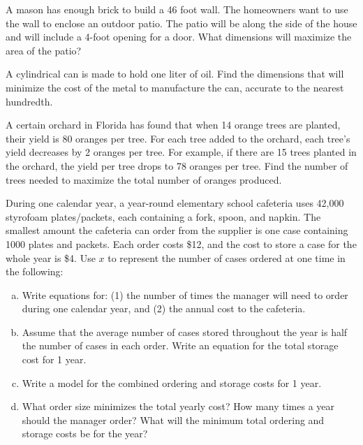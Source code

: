 \documentclass[notes]{subfiles}
\begin{document}
		\begin{ex}
			A mason has enough brick to build a 46 foot wall.  The homeowners want to use the wall to enclose an outdoor patio.  The patio will be along the side of the house and will include a 4-foot opening for a door.  What dimensions will maximize the area of the patio?
		\end{ex}
			
		\begin{ex}
			A cylindrical can is made to hold one liter of oil.  Find the dimensions that will minimize the cost of the metal to manufacture the can, accurate to the nearest hundredth.
		\end{ex}
			\newpage
			
		\begin{ex}
			A certain orchard in Florida has found that when 14 orange trees are planted, their yield is 80 oranges per tree.  For each tree added to the orchard, each tree's yield decreases by 2 oranges per tree.  For example, if there are 15 trees planted in the orchard, the yield per tree drops to 78 oranges per tree.  Find the number of trees needed to maximize the total number of oranges produced.
		\end{ex}
			\newpage

			
		\begin{ex}
			During one calendar year, a year-round elementary school cafeteria uses 42,000 styrofoam plates/packets, each containing a fork, spoon, and napkin.  The smallest amount the cafeteria can order from the supplier is one case containing 1000 plates and packets.  Each order costs \$12, and the cost to store a case for the whole year is \$4. Use $x$ to represent the number of cases ordered at one time in the following:
			\begin{enumerate}[(a)]
				\item Write equations for: (1) the number of times the manager will need to order during one calendar year, and (2) the annual cost to the cafeteria.
				\item Assume that the average number of cases stored throughout the year is half the number of cases in each order.  Write an equation for the total storage cost for 1 year.
				\item Write a model for the combined ordering and storage costs for 1 year.
				\item What order size minimizes the total yearly cost?  How many times a year should the manager order?  What will the minimum total ordering and storage costs be for the year?
			\end{enumerate}
		\end{ex}
			\newpage
			
\end{document}
